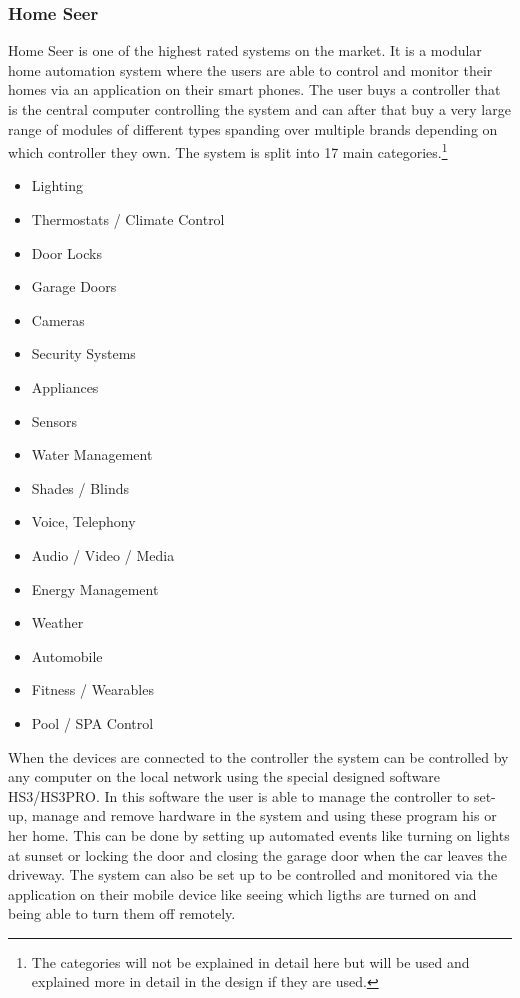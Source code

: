 \subsubsection{Home Seer}
Home Seer is one of the highest rated systems on the market. It is a modular home automation system where the users are able to control and monitor their homes via an application on their smart phones. The user buys a controller that is the central computer controlling the system and can after that buy a very large range of modules of different types spanding over multiple brands depending on which controller they own. The system is split into 17 main categories.\footnote{The categories will not be explained in detail here but will be used and explained more in detail in the design if they are used.}
\begin{itemize}
	\item Lighting
	\item Thermostats / Climate Control
	\item Door Locks
	\item Garage Doors
	\item Cameras
	\item Security Systems
	\item Appliances
	\item Sensors
	\item Water Management
	\item Shades / Blinds
	\item Voice, Telephony
	\item Audio / Video / Media
	\item Energy Management
	\item Weather
	\item Automobile
	\item Fitness / Wearables
	\item Pool / SPA Control
\end{itemize}%
When the devices are connected to the controller the system can be controlled by any computer on the local network using the special designed software HS3/HS3PRO. In this software the user is able to manage the controller to set-up, manage and remove hardware in the system and using these program his or her home. This can be done by setting up automated events like turning on lights at sunset or locking the door and closing the garage door when the car leaves the driveway. The system can also be set up to be controlled and monitored via the application on their mobile device like seeing which ligths are turned on and being able to turn them off remotely.%

